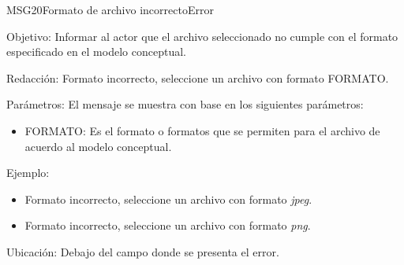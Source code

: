 \begin{mensaje}{MSG20}{Formato de archivo incorrecto}{Error}
	\item [Objetivo:] Informar al actor que el archivo seleccionado no cumple con el formato especificado en el modelo conceptual.
	\item[Redacción:] Formato incorrecto, seleccione un archivo con formato FORMATO.
	\item[Parámetros:] El mensaje se muestra con base en los siguientes parámetros:
	\begin{itemize}
		\item FORMATO: Es el formato o formatos que se permiten para el archivo de acuerdo al modelo conceptual.
	\end{itemize}
	\item[Ejemplo:] \begin{itemize}
		\item Formato incorrecto, seleccione un archivo con formato {\em jpeg}.
		\item Formato incorrecto, seleccione un archivo con formato {\em png}.
	\end{itemize}
	\item [Ubicación:] Debajo del campo donde se presenta el error.
\end{mensaje}